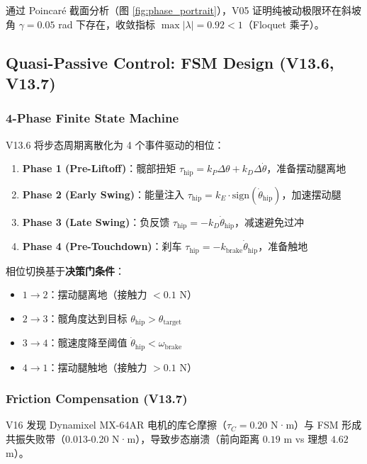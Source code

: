 通过 Poincaré 截面分析（图 \ref{fig:phase_portrait}），V05 证明纯被动极限环在斜坡角 $\gamma = 0.05$ rad 下存在，收敛指标 $\max|\lambda| = 0.92 < 1$（Floquet 乘子）。

\subsection{Quasi-Passive Control: FSM Design (V13.6, V13.7)}

\subsubsection{4-Phase Finite State Machine}

V13.6 将步态周期离散化为 4 个事件驱动的相位：

\begin{enumerate}
    \item \textbf{Phase 1 (Pre-Liftoff)}：髋部扭矩 $\tau_{\text{hip}} = k_P \Delta\theta + k_D \Delta\dot{\theta}$，准备摆动腿离地
    \item \textbf{Phase 2 (Early Swing)}：能量注入 $\tau_{\text{hip}} = k_E \cdot \text{sign}(\dot{\theta}_{\text{hip}})$，加速摆动腿
    \item \textbf{Phase 3 (Late Swing)}：负反馈 $\tau_{\text{hip}} = -k_D \dot{\theta}_{\text{hip}}$，减速避免过冲
    \item \textbf{Phase 4 (Pre-Touchdown)}：刹车 $\tau_{\text{hip}} = -k_{\text{brake}} \dot{\theta}_{\text{hip}}$，准备触地
\end{enumerate}

相位切换基于\textbf{决策门条件}：
\begin{itemize}
    \item $1 \to 2$：摆动腿离地（接触力 $< 0.1$ N）
    \item $2 \to 3$：髋角度达到目标 $\theta_{\text{hip}} > \theta_{\text{target}}$
    \item $3 \to 4$：髋速度降至阈值 $\dot{\theta}_{\text{hip}} < \omega_{\text{brake}}$
    \item $4 \to 1$：摆动腿触地（接触力 $> 0.1$ N）
\end{itemize}

\subsubsection{Friction Compensation (V13.7)}

V16 发现 Dynamixel MX-64AR 电机的库仑摩擦（$\tau_C = 0.20$ N·m）与 FSM 形成共振失败带（0.013-0.20 N·m），导致步态崩溃（前向距离 $0.19$ m vs 理想 $4.62$ m）。

